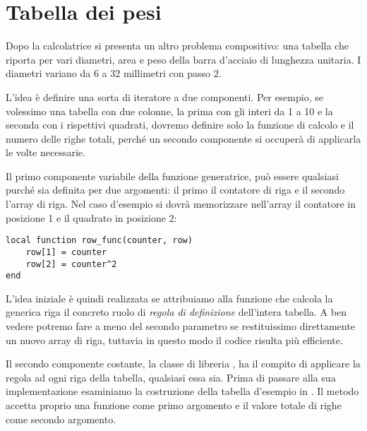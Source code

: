 
\section{Tabella dei pesi}

Dopo la calcolatrice si presenta un altro problema compositivo: una tabella che
riporta per vari diametri, area e peso della barra d'acciaio di lunghezza
unitaria. I diametri variano da 6 a 32 millimetri con passo 2.

L'idea è definire una sorta di iteratore a due componenti. Per esempio, se
volessimo una tabella con due colonne, la prima con gli interi da 1 a 10 e la
seconda con i rispettivi quadrati, dovremo definire solo la funzione di calcolo
e il numero delle righe totali, perché un secondo componente si occuperà di
applicarla le volte necessarie.

Il primo componente variabile della funzione generatrice, può essere qualsiasi
purché sia definita per due argomenti: il primo il contatore di riga e il
secondo l'array di riga. Nel caso d'esempio si dovrà memorizzare nell'array il
contatore in posizione 1 e il quadrato in posizione 2:
\begin{Verbatim}
local function row_func(counter, row)
    row[1] = counter
    row[2] = counter^2
end
\end{Verbatim}

L'idea iniziale è quindi realizzata se attribuiamo alla funzione che calcola la
generica riga il concreto ruolo di \emph{regola di definizione} dell'intera
tabella. A ben vedere potremo fare a meno del secondo parametro  se
restituissimo direttamente un nuovo array di riga, tuttavia in questo modo il
codice risulta più efficiente.


Il secondo componente costante, la classe di libreria , ha il compito
di applicare la regola ad ogni riga della tabella, qualsiasi essa sia. Prima di
passare alla sua implementazione esaminiamo la costruzione della tabella
d'esempio in \LuaLaTeX{}. Il metodo  accetta proprio una funzione come
primo argomento e il valore totale di righe come secondo argomento.


